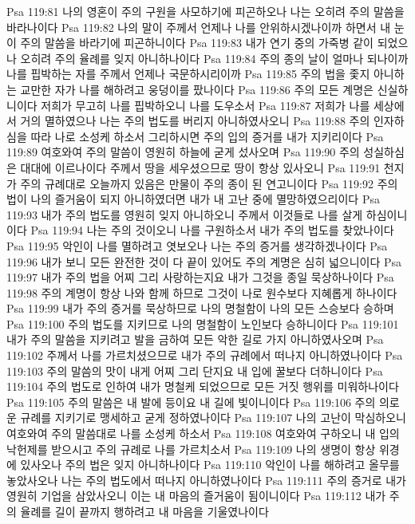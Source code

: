 Psa 119:81  나의 영혼이 주의 구원을 사모하기에 피곤하오나 나는 오히려 주의 말씀을 바라나이다
Psa 119:82  나의 말이 주께서 언제나 나를 안위하시겠나이까 하면서 내 눈이 주의 말씀을 바라기에 피곤하니이다
Psa 119:83  내가 연기 중의 가죽병 같이 되었으나 오히려 주의 율례를 잊지 아니하나이다
Psa 119:84  주의 종의 날이 얼마나 되나이까 나를 핍박하는 자를 주께서 언제나 국문하시리이까
Psa 119:85  주의 법을 좇지 아니하는 교만한 자가 나를 해하려고 웅덩이를 팠나이다
Psa 119:86  주의 모든 계명은 신실하니이다 저희가 무고히 나를 핍박하오니 나를 도우소서
Psa 119:87  저희가 나를 세상에서 거의 멸하였으나 나는 주의 법도를 버리지 아니하였사오니
Psa 119:88  주의 인자하심을 따라 나로 소성케 하소서 그리하시면 주의 입의 증거를 내가 지키리이다
Psa 119:89  여호와여 주의 말씀이 영원히 하늘에 굳게 섰사오며
Psa 119:90  주의 성실하심은 대대에 이르나이다 주께서 땅을 세우셨으므로 땅이 항상 있사오니
Psa 119:91  천지가 주의 규례대로 오늘까지 있음은 만물이 주의 종이 된 연고니이다
Psa 119:92  주의 법이 나의 즐거움이 되지 아니하였더면 내가 내 고난 중에 멸망하였으리이다
Psa 119:93  내가 주의 법도를 영원히 잊지 아니하오니 주께서 이것들로 나를 살게 하심이니이다
Psa 119:94  나는 주의 것이오니 나를 구원하소서 내가 주의 법도를 찾았나이다
Psa 119:95  악인이 나를 멸하려고 엿보오나 나는 주의 증거를 생각하겠나이다
Psa 119:96  내가 보니 모든 완전한 것이 다 끝이 있어도 주의 계명은 심히 넓으니이다
Psa 119:97  내가 주의 법을 어찌 그리 사랑하는지요 내가 그것을 종일 묵상하나이다
Psa 119:98  주의 계명이 항상 나와 함께 하므로 그것이 나로 원수보다 지혜롭게 하나이다
Psa 119:99  내가 주의 증거를 묵상하므로 나의 명철함이 나의 모든 스승보다 승하며
Psa 119:100  주의 법도를 지키므로 나의 명철함이 노인보다 승하니이다
Psa 119:101  내가 주의 말씀을 지키려고 발을 금하여 모든 악한 길로 가지 아니하였사오며
Psa 119:102  주께서 나를 가르치셨으므로 내가 주의 규례에서 떠나지 아니하였나이다
Psa 119:103  주의 말씀의 맛이 내게 어찌 그리 단지요 내 입에 꿀보다 더하니이다
Psa 119:104  주의 법도로 인하여 내가 명철케 되었으므로 모든 거짓 행위를 미워하나이다
Psa 119:105  주의 말씀은 내 발에 등이요 내 길에 빛이니이다
Psa 119:106  주의 의로운 규례를 지키기로 맹세하고 굳게 정하였나이다
Psa 119:107  나의 고난이 막심하오니 여호와여 주의 말씀대로 나를 소성케 하소서
Psa 119:108  여호와여 구하오니 내 입의 낙헌제를 받으시고 주의 규례로 나를 가르치소서
Psa 119:109  나의 생명이 항상 위경에 있사오나 주의 법은 잊지 아니하나이다
Psa 119:110  악인이 나를 해하려고 올무를 놓았사오나 나는 주의 법도에서 떠나지 아니하였나이다
Psa 119:111  주의 증거로 내가 영원히 기업을 삼았사오니 이는 내 마음의 즐거움이 됨이니이다
Psa 119:112  내가 주의 율례를 길이 끝까지 행하려고 내 마음을 기울였나이다
